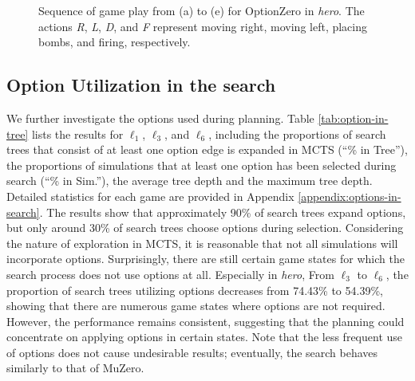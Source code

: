 \begin{figure}[h]
    \centering
\caption{Sequence of game play from (a) to (e) for OptionZero in \textit{hero}. The actions \textit{R}, \textit{L}, \textit{D}, and \textit{F} represent moving right, moving left, placing bombs, and firing, respectively.}
    \label{fig:hero}
\end{figure}


\subsection{Option Utilization in the search}
\label{sec:behavior-analysis-in-search}
We further investigate the options used during planning.
Table \ref{tab:option-in-tree} lists the results for $\ell_1$, $\ell_3$, and $\ell_6$, including the proportions of search trees that consist of at least one option edge is expanded in MCTS (``\% in Tree''), the proportions of simulations that at least one option has been selected during search (``\% in Sim.''), the average tree depth and the maximum tree depth.
Detailed statistics for each game are provided in Appendix \ref{appendix:options-in-search}.
The results show that approximately 90\% of search trees expand options, but only around 30\% of search trees choose options during selection.
Considering the nature of exploration in MCTS, it is reasonable that not all simulations will incorporate options.
Surprisingly, there are still certain game states for which the search process does not use options at all.
Especially in \textit{hero}, From $\ell_3$ to $\ell_6$, the proportion of search trees utilizing options decreases from 74.43\% to 54.39\%, showing that there are numerous game states where options are not required.
However, the performance remains consistent, suggesting that the planning could concentrate on applying options in certain states.
Note that the less frequent use of options does not cause undesirable results; eventually, the search behaves similarly to that of MuZero.


